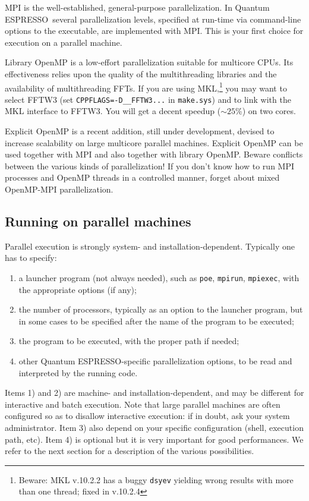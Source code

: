 \documentclass[12pt,a4paper]{article}
\def\qe{{\sc Quantum ESPRESSO}}
\begin{document}
MPI is the well-established, general-purpose parallelization.
In \qe\ several parallelization levels, specified at run-time
via command-line options to the executable, are implemented
with MPI. This is your first choice for execution on a parallel 
machine.

Library OpenMP is a low-effort parallelization suitable for
multicore CPUs. Its effectiveness relies upon the quality of 
the multithreading libraries and the availability of 
multithreading FFTs. If you are using MKL,\footnote{Beware: 
MKL v.10.2.2 has a buggy \texttt{dsyev} yielding wrong results 
with more than one thread; fixed in v.10.2.4}
you may want to select FFTW3 (set \texttt{CPPFLAGS=-D\_\_FFTW3...}
in \texttt{make.sys}) and to link with the MKL interface to FFTW3. 
You will get a decent speedup ($\sim 25$\%) on two cores.

Explicit OpenMP is a recent addition, still under
development, devised to increase scalability on
large multicore parallel machines. Explicit OpenMP can be used
together with MPI and also together with library OpenMP. Beware
conflicts between the various kinds of parallelization! 
If you don't know how to run MPI processes
and OpenMP threads in a controlled manner, forget about mixed 
OpenMP-MPI parallelization.

\subsection{Running on parallel machines}

Parallel execution is strongly system- and installation-dependent. 
Typically one has to specify:
\begin{enumerate}
\item a launcher program (not always needed), 
such as \texttt{poe}, \texttt{mpirun}, \texttt{mpiexec},
  with the  appropriate options (if any);
\item the number of processors, typically as an option to the launcher
  program, but in some cases to be specified after the name of the
  program to be
  executed; 
\item the program to be executed, with the proper path if needed; 
\item other \qe-specific parallelization options, to be
  read and interpreted by the running code.
\end{enumerate}  
Items 1) and 2) are machine- and installation-dependent, and may be 
different for interactive and batch execution. Note that large
parallel machines are  often configured so as to disallow interactive
execution: if in doubt, ask your system administrator.
Item 3) also depend on your specific configuration (shell, execution path, etc). 
Item 4) is optional but it is very important
for good performances. We refer to the next
section for a description of the various 
possibilities.
\end{document}
